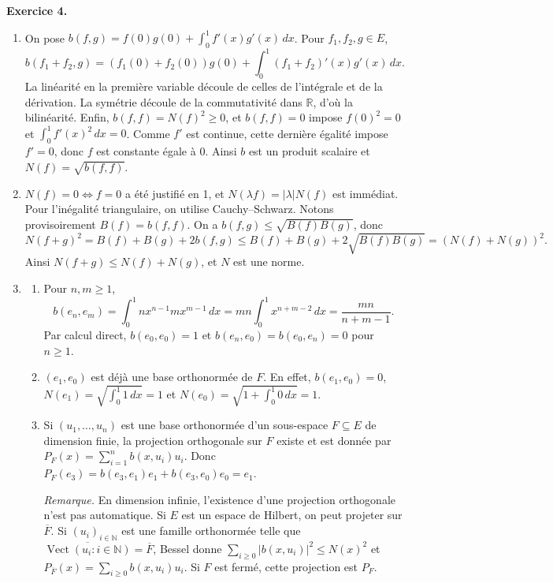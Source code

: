 \documentclass[11pt,a4paper]{article}
\newcommand{\R}{\mathbb{R}}
\begin{document}
\medskip
{}
\noindent\textbf{Exercice 4.}
\begin{enumerate}[label=\arabic*.,leftmargin=*,itemsep=1em]
\item On pose $b(f,g)=f(0)g(0)+\int_0^1 f'(x)g'(x)\,dx$. Pour $f_1,f_2,g\in E$,
\[
  b(f_1+f_2,g)=(f_1(0)+f_2(0))g(0)+\int_0^1(f_1+f_2)'(x)g'(x)\,dx.
\]
La linéarité en la première variable découle de celles de l'intégrale et de la dérivation. La symétrie découle de la commutativité dans $\R$, d'où la bilinéarité. Enfin, $b(f,f)=N(f)^2\geq0$, et $b(f,f)=0$ impose $f(0)^2=0$ et $\int_0^1 f'(x)^2\,dx=0$. Comme $f'$ est continue, cette dernière égalité impose $f'=0$, donc $f$ est constante égale à $0$. Ainsi $b$ est un produit scalaire et $N(f)=\sqrt{b(f,f)}$.

\item $N(f)=0\iff f=0$ a été justifié en 1, et $N(\lambda f)=|\lambda|N(f)$ est immédiat. Pour l'inégalité triangulaire, on utilise Cauchy--Schwarz. Notons provisoirement $B(f)=b(f,f)$. On a $b(f,g)\leq\sqrt{B(f)B(g)}$, donc
\[
  N(f+g)^2=B(f)+B(g)+2b(f,g)
  \leq B(f)+B(g)+2\sqrt{B(f)B(g)}=(N(f)+N(g))^2.
\]
Ainsi $N(f+g)\leq N(f)+N(g)$, et $N$ est une norme.

\item
  \begin{enumerate}[label=(\alph*),itemsep=.6em]
  \item Pour $n,m\geq1$,
  \[
    b(e_n,e_m)=\int_0^1 nx^{n-1}mx^{m-1}\,dx
    =mn\int_0^1x^{n+m-2}\,dx=\frac{mn}{n+m-1}.
  \]
  Par calcul direct, $b(e_0,e_0)=1$ et $b(e_n,e_0)=b(e_0,e_n)=0$ pour $n\geq1$.

  \item $(e_1,e_0)$ est déjà une base orthonormée de $F$. En effet, $b(e_1,e_0)=0$, $N(e_1)=\sqrt{\int_0^1 1\,dx}=1$ et $N(e_0)=\sqrt{1+\int_0^1 0\,dx}=1$.

  \item Si $(u_1,\ldots,u_n)$ est une base orthonormée d'un sous-espace $F\subseteq E$ de dimension finie, la projection orthogonale sur $F$ existe et est donnée par $P_F(x)=\sum_{i=1}^n b(x,u_i)u_i$. Donc $P_F(e_3)=b(e_3,e_1)e_1+b(e_3,e_0)e_0=e_1$.

  \smallskip
  \textit{Remarque.} En dimension infinie, l'existence d'une projection orthogonale n'est pas automatique. Si $E$ est un espace de Hilbert, on peut projeter sur $\overline F$. Si $(u_i)_{i\in\mathbb N}$ est une famille orthonormée telle que $\overline{\operatorname{Vect}(u_i:i\in\mathbb N)}=\overline F$, Bessel donne $\sum_{i\geq0}|b(x,u_i)|^2\leq N(x)^2$ et $P_{\overline F}(x)=\sum_{i\geq0}b(x,u_i)u_i$. Si $F$ est fermé, cette projection est $P_F$.
  \end{enumerate}


\end{enumerate}
\end{document}
